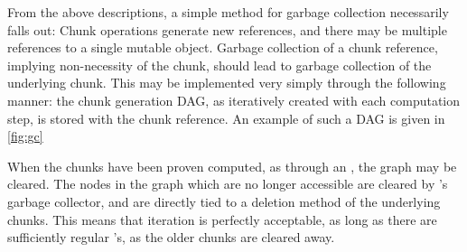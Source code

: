 From the above descriptions, a simple method for garbage collection necessarily falls out: Chunk operations generate new references, and there may be multiple references to a single mutable object.
Garbage collection of a chunk reference, implying non-necessity of the chunk, should lead to garbage collection of the underlying chunk.
This may be implemented very simply through the following manner: the chunk generation DAG, as iteratively created with each computation step, is stored with the chunk reference.
An example of such a DAG is given in \cref{fig:gc}


When the chunks have been proven computed, as through an , the graph may be cleared.
The nodes in the graph which are no longer accessible are cleared by \R{}'s garbage collector, and are directly tied to a deletion method of the underlying chunks.
This means that iteration is perfectly acceptable, as long as there are sufficiently regular 's, as the older chunks are cleared away.
